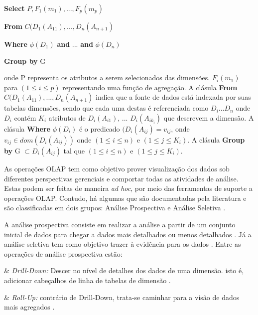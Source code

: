 \textbf{Select} $\displaystyle P,F_{1}(m_1),..., F_p(m_p)$

\textbf{From} $\displaystyle C(D_1(A_{11}),...,D_n(A_{n+1})$

\textbf{Where} $\displaystyle \phi(D_1)$ \textbf{and} ... \textbf{and}  $\displaystyle\phi(D_n)$

\textbf{Group by} G

onde P representa os atributos a serem selecionados das dimensões. $\displaystyle F_{i}(m_1)$ para $\displaystyle (1 \leq i \leq p) $ representando uma função de agregação. A clásula \textbf{From} $\displaystyle C(D_1(A_{11}),...,D_n(A_{n+1})$ indica que a fonte de dados está indexada por suas tabelas dimensões, sendo que cada uma destas é referenciada como $\displaystyle D_i ... D_n $ onde  $\displaystyle D_i $ contém  $\displaystyle K_i$ atributos de  $\displaystyle D_i(A_{i1})$, ... $ \displaystyle D_i(A_{ik_{i}}) $ que descrevem a dimensão.  A clásula \textbf{Where} $\displaystyle \phi(D_i)$ é o predicado $\displaystyle (D_i(A_{ij}) = v_{ij}$, onde $\displaystyle v_{ij} \in dom(D_i(A_{ij}))$ onde $\displaystyle (1 \leq i \leq n) $ e $\displaystyle (1 \leq j \leq K_{i}) $. A clásula \textbf{Group by} G $\displaystyle \subset {D_{i}(A_{ij})} $ tal que $\displaystyle (1 \leq i \leq n) $ e $\displaystyle (1 \leq j \leq K_{i})$.


As operações OLAP tem como objetivo prover visualização dos dados sob diferentes perspectivas gerenciais e comportar todas as atividades de análise. Estas podem ser feitas de maneira \textit{ad hoc}, por meio das ferramentas de suporte a operações OLAP. Contudo, há algumas que são documentadas pela literatura e são classificadas em dois grupos: Análise Prospectiva e Análise Seletiva .

A análise prospectiva consiste em realizar a análise a partir de um conjunto inicial de dados para chegar a dados mais detalhados ou menos detalhados \cite{Inmon1992}. Já a análise seletiva tem como objetivo trazer à evidência para os dados \cite{andre2000}. Entre as operações de análise prospectiva estão:

\begin{easylist}[itemize]

& \textit{Drill-Down:} Descer no nível de detalhes dos dados de uma dimensão. isto é, adicionar cabeçalhos de linha de tabelas de dimensão \cite{Kimball2002}.

& \textit{Roll-Up:} contrário de Drill-Down, trata-se caminhar para a visão de dados mais agregados . 


\end{easylist}


